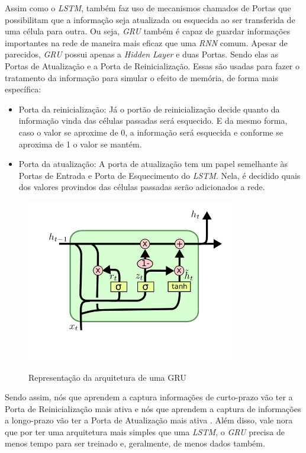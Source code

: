 Assim como o \textit{\acrshort{LSTM}}, também faz uso de mecanismos chamados de Portas que possibilitam que a informação seja atualizada ou esquecida ao ser transferida de uma célula para outra. Ou seja, \textit{\acrshort{GRU}} também é capaz de guardar informações importantes na rede de maneira mais eficaz que uma \textit{\acrshort{RNN}} comum. Apesar de parecidos, \textit{\acrshort{GRU}} possui apenas a \textit{Hidden Layer} e duas Portas. Sendo elas as Portas de Atualização e a Porta de Reinicialização. Essas são usadas para fazer o tratamento da informação para simular o efeito de memória, de forma mais específica:

\begin{itemize}
    \item Porta da reinicialização: Já o portão de reinicialização decide quanto da informação vinda das células passadas será esquecido. E da mesmo forma, caso o valor se aproxime de 0, a informação será esquecida e conforme se aproxima de 1 o valor se mantém.
    
    \item Porta da atualização: A porta de atualização tem um papel semelhante às Portas de Entrada e Porta de Esquecimento do \textit{\acrshort{LSTM}}. Nela, é decidido quais dos valores provindos das células passadas serão adicionados a rede.
\end{itemize}

\begin{figure}[htbp]
    \centering
    \includegraphics[scale=1.0]{monography/img/models/GRU.png}
    \label{figure:gru}
    \caption[Representação da arquitetura de uma GRU]{Representação da arquitetura de uma GRU\footnotemark}
\end{figure}

Sendo assim, nós que aprendem a captura informações de curto-prazo vão ter a Porta de Reinicialização mais ativa e nós que aprendem a captura de informações a longo-prazo vão ter a Porta de Atualização mais ativa \cite{cho2014}. Além disso, vale nora que por ter uma arquitetura mais simples que uma \textit{\acrshort{LSTM}}, o \textit{\acrshort{GRU}} precisa de menos tempo para ser treinado e, geralmente, de menos dados também.